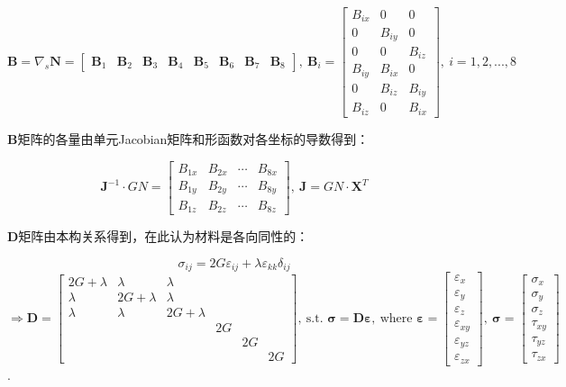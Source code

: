 \documentclass[UTF8]{ctexbook}
\begin{document}
\begin{itemize}
\begin{enumerate}
\begin{itemize}
\[
\boldsymbol{B}=\nabla_{s}\boldsymbol{N}=\begin{bmatrix}\boldsymbol{B}_{1} & \boldsymbol{B}_{2} & \boldsymbol{B}_{3} & \boldsymbol{B}_{4} & \boldsymbol{B}_{5} & \boldsymbol{B}_{6} & \boldsymbol{B}_{7} & \boldsymbol{B}_{8}\end{bmatrix},\ \boldsymbol{B}_{i}=\begin{bmatrix}B_{ix} & 0 & 0\\
0 & B_{iy} & 0\\
0 & 0 & B_{iz}\\
B_{iy} & B_{ix} & 0\\
0 & B_{iz} & B_{iy}\\
B_{iz} & 0 & B_{ix}
\end{bmatrix},\ i=1,2,...,8
\]



$\boldsymbol{B}$矩阵的各量由单元Jacobian矩阵和形函数对各坐标的导数得到：


\[
\boldsymbol{J}^{-1}\cdot GN=\begin{bmatrix}B_{1x} & B_{2x} & \cdots & B_{8x}\\
B_{1y} & B_{2y} & \cdots & B_{8y}\\
B_{1z} & B_{2z} & \cdots & B_{8z}
\end{bmatrix},\ \boldsymbol{J}=GN\cdot\boldsymbol{X}^{T}
\]



$\boldsymbol{D}$矩阵由本构关系得到，在此认为材料是各向同性的：


\[
\sigma_{ij}=2G\varepsilon_{ij}+\lambda\varepsilon_{kk}\delta_{ij}
\]
$\Rightarrow\boldsymbol{D}=\begin{bmatrix}2G+\lambda & \lambda & \lambda\\
\lambda & 2G+\lambda & \lambda\\
\lambda & \lambda & 2G+\lambda\\
 &  &  & 2G\\
 &  &  &  & 2G\\
 &  &  &  &  & 2G
\end{bmatrix},\ \text{s.t. }\boldsymbol{\sigma}=\boldsymbol{D\varepsilon},\ \text{where }\boldsymbol{\varepsilon}=\begin{bmatrix}\varepsilon_{x}\\
\varepsilon_{y}\\
\varepsilon_{z}\\
\varepsilon_{xy}\\
\varepsilon_{yz}\\
\varepsilon_{zx}
\end{bmatrix},\ \boldsymbol{\sigma}=\begin{bmatrix}\sigma_{x}\\
\sigma_{y}\\
\sigma_{z}\\
\tau_{xy}\\
\tau_{yz}\\
\tau_{zx}
\end{bmatrix}$.



\end{itemize}
\end{enumerate}
\end{itemize}
\end{document}
